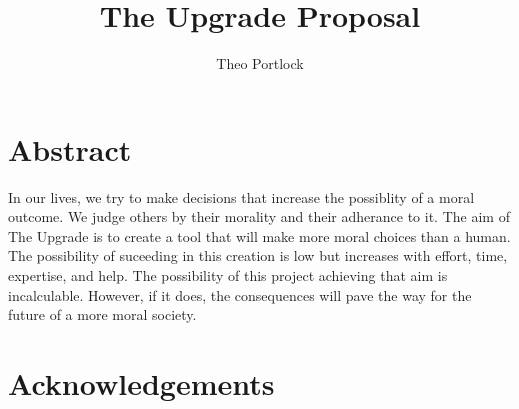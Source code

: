\documentclass[12pt]{book}
\title{The Upgrade Proposal}
\author{Theo Portlock}
\begin{document}
\frontmatter
\maketitle

\chapter{Abstract}
In our lives, we try to make decisions that increase the possiblity of a moral outcome. We judge others by their morality and their adherance to it. The aim of The Upgrade is to create a tool that will make more moral choices than a human. The possibility of suceeding in this creation is low but increases with effort, time, expertise, and help. The possibility of this project achieving that aim is incalculable. However, if it does, the consequences will pave the way for the future of a more moral society.

\cleardoublepage
{}
{}
\tableofcontents

\cleardoublepage
{}
{}
\singlespacing
\glsfindwidesttoplevelname
\printglossary[title={Abbreviations},style=alttree]
\doublespacing

\cleardoublepage
{}
{}
\listoffigures

\cleardoublepage
{}
{}
\listoftables

\mainmatter








\backmatter


\chapter{Acknowledgements}


\end{document}
